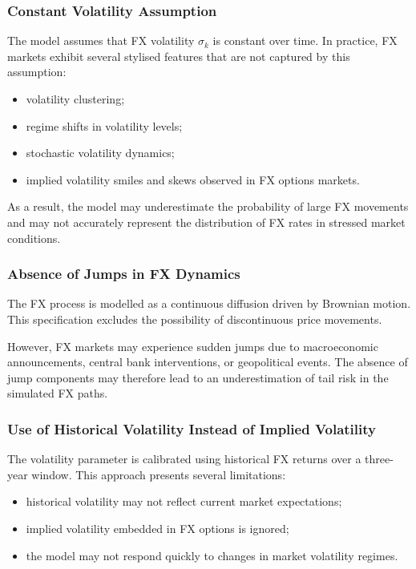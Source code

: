 \subsubsection{Constant Volatility Assumption}

The model assumes that FX volatility $\sigma_k$ is constant over time. In practice, FX markets exhibit several stylised features that are not captured by this assumption:

\begin{itemize}
	\item volatility clustering;
	\item regime shifts in volatility levels;
	\item stochastic volatility dynamics;
	\item implied volatility smiles and skews observed in FX options markets.
\end{itemize}

As a result, the model may underestimate the probability of large FX movements and may not accurately represent the distribution of FX rates in stressed market conditions.

\subsubsection{Absence of Jumps in FX Dynamics}

The FX process is modelled as a continuous diffusion driven by Brownian motion. This specification excludes the possibility of discontinuous price movements.

However, FX markets may experience sudden jumps due to macroeconomic announcements, central bank interventions, or geopolitical events. The absence of jump components may therefore lead to an underestimation of tail risk in the simulated FX paths.

\subsubsection{Use of Historical Volatility Instead of Implied Volatility}

The volatility parameter is calibrated using historical FX returns over a three-year window. This approach presents several limitations:

\begin{itemize}
	\item historical volatility may not reflect current market expectations;
	\item implied volatility embedded in FX options is ignored;
	\item the model may not respond quickly to changes in market volatility regimes.
\end{itemize}

